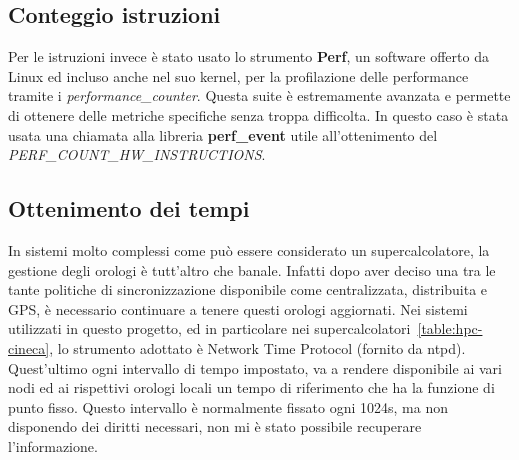 \subsection{Conteggio istruzioni}
Per le istruzioni invece è stato usato lo strumento \textbf{Perf}, un software offerto da Linux ed incluso anche nel suo kernel, per la profilazione delle performance tramite i \emph{performance\_counter}. Questa suite è estremamente avanzata e permette di ottenere delle metriche specifiche senza troppa difficolta. In questo caso è stata usata una chiamata alla libreria \textbf{perf\_event} utile all'ottenimento del \emph{PERF\_COUNT\_HW\_INSTRUCTIONS}.

\subsection{Ottenimento dei tempi}
In sistemi molto complessi come può essere considerato un supercalcolatore, la gestione degli orologi è tutt'altro che banale. Infatti dopo aver deciso una tra le tante politiche di sincronizzazione disponibile come centralizzata, distribuita e GPS, è necessario continuare a tenere questi orologi aggiornati. Nei sistemi utilizzati in questo progetto, ed in particolare nei supercalcolatori~\ref{table:hpc-cineca}, lo strumento adottato è Network Time Protocol (fornito da ntpd). Quest'ultimo ogni intervallo di tempo impostato, va a rendere disponibile ai vari nodi ed ai rispettivi orologi locali un tempo di riferimento che ha la funzione di punto fisso. Questo intervallo è normalmente fissato ogni 1024s, ma non disponendo dei diritti necessari, non mi è stato possibile recuperare l'informazione.

